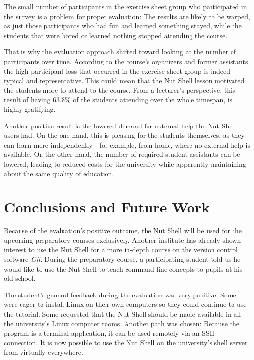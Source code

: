 \documentclass[paper=a4,twoside,abstract=on,cleardoublepage=empty,numbers=noenddot,toc=bib,12pt,appendixprefix=true]{scrreprt}
\begin{document}
The small number of participants in the exercise sheet group who participated in the survey is a problem for proper evaluation: The results are likely to be warped, as just those participants who had fun and learned something stayed, while the students that were bored or learned nothing stopped attending the course.

That is why the evaluation approach shifted toward looking at the number of participants over time. According to the course's organizers and former assistants, the high participant loss that occurred in the exercise sheet group is indeed typical and representative. This could mean that the Nut Shell lesson motivated the students more to attend to the course. From a lecturer's perspective, this result of having 63.8\% of the students attending over the whole timespan, is highly gratifying.

Another positive result is the lowered demand for external help the Nut Shell users had. On the one hand, this is pleasing for the students themselves, as they can learn more independently---for example, from home, where no external help is available. On the other hand, the number of required student assistants can be lowered, leading to reduced costs for the university while apparently maintaining about the same quality of education.

\chapter{Conclusions and Future Work}
\label{sec:conclusions}

Because of the evaluation's positive outcome, the Nut Shell will be used for the upcoming preparatory courses exclusively. Another institute has already shown interest to use the Nut Shell for a more in-depth course on the version control software \emph{Git}. During the preparatory course, a participating student told us he would like to use the Nut Shell to teach command line concepts to pupils at his old school.

The student's general feedback during the evaluation was very positive. Some were eager to install Linux on their own computers so they could continue to use the tutorial. Some requested that the Nut Shell should be made available in all the university's Linux computer rooms. Another path was chosen: Because the program is a terminal application, it can be used remotely via an SSH connection. It is now possible to use the Nut Shell on the university's shell server from virtually everywhere.
\end{document}
